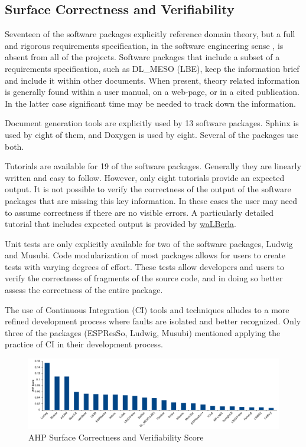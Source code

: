 \documentclass[final, 3p, times, authoryear]{elsarticle}
\begin{document}
\subsection{Surface Correctness and Verifiability} \label{SecSurfCorrectAndVerifiab}

Seventeen of the software packages explicitly reference domain theory, but a
full and rigorous requirements specification, in the software engineering sense
\citep{IEEE1998, RobertsonAndRobertson1999Vol, ESA1991}, is absent from all of
the projects. Software packages that include a subset of a requirements
specification, such as DL\_MESO (LBE), keep the information brief and include it
within other documents. When present, theory related information is generally
found within a user manual, on a web-page, or in a cited publication. In the
latter case significant time may be needed to track down the information.

Document generation tools are explicitly used by 13 software packages. Sphinx is
used by eight of them, and Doxygen is used by eight. Several of the packages use
both.

Tutorials are available for 19 of the software packages. Generally they are
linearly written and easy to follow. However, only eight tutorials provide an
expected output. It is not possible to verify the correctness of the output of
the software packages that are missing this key information. In these cases the
user may need to assume correctness if there are no visible errors.  A
particularly  detailed tutorial that includes expected output is provided by
\href{https://www.walberla.net/doxygen/index.html} {waLBerla}.

Unit tests are only explicitly available for two of the software packages,
Ludwig and Musubi. Code modularization of most packages allows for users to
create tests with varying degrees of effort. These tests allow developers and
users to verify the correctness of fragments of the source code, and in doing so
better assess the correctness of the entire package.

The use of Continuous Integration (CI) tools and techniques alludes to a more
refined development process where faults are isolated and better recognized.
Only three of the packages (ESPResSo, Ludwig, Musubi) mentioned applying the
practice of CI in their development process.

\begin{figure}[h!]
	\begin{center}
		\includegraphics[width=1.0\textwidth]{./figures/correctnessverifiability.pdf}
		\caption{AHP Surface Correctness and Verifiability Score}
		\label{Fig_CorrectnessVerifiability}
	\end{center}
\end{figure}
\end{document}

